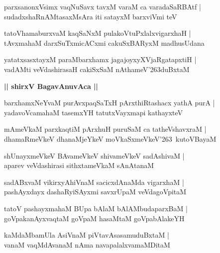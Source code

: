 \documentclass[twoside,12pt,openright]{book}
\def\S{\char'263}
\newcounter{shloka}[chapter]
\def\uvaca#1{\centerline{{\large\textbf{#1}}}}
\begin{document}
\begin{shloka}%
parxsanonxVsimx vaqNuSavx tavxM varaM ca varadaSaRBAtf |\\
sudadxshaRnAMtasaxMsAra iti satayxM barxviVmi teV 
\end{shloka}

\begin{shloka}%
tatoVhamaburxvaM kaqSaNxM pulakoVtuPxlalxvigarxhaH |\\
tAvxmahaM darxSuTxmicACxmi cakuSxBARyxM madhusUdana
\end{shloka}

\begin{shloka}%
yatatxsasxtayxM paraMbarxhamx jagajoyxyXVjaRgatapxtiH |\\
vadAMti veVdashirasaH cakiSxSaM nAthameV\S duBxtaM 
\end{shloka}

\uvaca{|| shirxV BagavAnuvAca ||}

\begin{shloka}%
barxhamxNeYvaM purAvxpaqSaTxH pArxthiRtashacx yathA purA |\\
yadavoVcamahaM tasemxYH tatutxVayxmapi kathayxteV
\end{shloka}

\begin{shloka}%
mAmeVkaM parxkaqtiM pArxhuH puruSaM ca tatheVshavxraM |\\
dhamaRmeVkeV dhanaMjeYkeV moVkaSxmeVkeV\S ~kutoVBayaM
\end{shloka}

\begin{shloka}%
shUnayxmeVkeV BAvameVkeV shivameVkeV sadAshivaM |\\
aparev veVdashirasi sithxtameVkaM sAnAtanaM 
\end{shloka}

\begin{shloka}%
sadABxvaM vikirxyAhiVnaM sacicxdAnaMda vigarxhaM |\\
pashAyxdayx dashaRyiSAyxmi savxrUpaM veVdagoVpitaM 
\end{shloka}

\begin{shloka}%
tatoV pashayxmahaM BUpa bAlaM bAlAMbudaparxBaM |\\
goVpakanAyxvaqtaM goVpaM hasaMtaM goVpabAlakeYH
\end{shloka}

\begin{shloka}%
kaMdaMbamUla AsiVnaM piVtavAsasamuduBxtaM |\\
vanaM vaqMdAvanaM nAma navapalalxvamaMDitaM 
\end{shloka}
\end{document}
